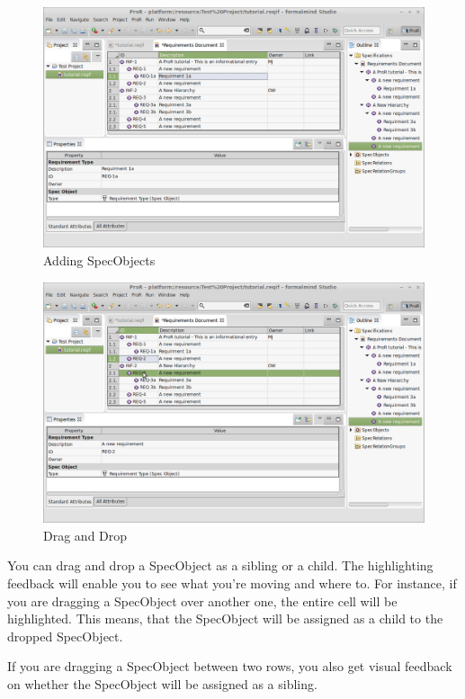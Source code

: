\begin{figure}[H]
\centering
\includegraphics[width=\linewidth]{../rmf-images/hierarchy_example.png}      
\caption{Adding SpecObjects}      
\label{fig:Requirements Hierarchy}
\end{figure}

\begin{figure}[H]
\centering
\includegraphics[width=\linewidth]{../rmf-images/draganddrop.png}    
\caption{Drag and Drop}      
\label{fig:dragAndDropChild}
\end{figure}
You can drag and drop a SpecObject as a sibling or a child.  The highlighting feedback will enable you to see what you're moving and where to.  For instance, if you are dragging a SpecObject over another one, the entire cell will be highlighted.  This means, that the SpecObject will be assigned as a child to the dropped SpecObject.

If you are dragging a SpecObject between two rows, you also get visual feedback on whether the SpecObject will be assigned as a sibling.

